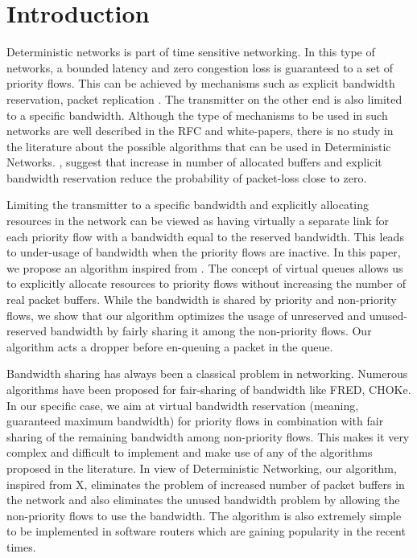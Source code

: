 \documentclass[conference]{IEEEtran}
\begin{document}
\section{Introduction}

Deterministic networks is part of time sensitive networking. In this type of networks, a bounded latency and zero congestion loss is guaranteed to a set of priority flows. This can be achieved by mechanisms such as explicit bandwidth reservation, packet replication \cite{detnetrfc}. The transmitter on the other end is also limited to a specific bandwidth. Although the type of mechanisms to be used in such networks are well described in the RFC and white-papers, there is no study in the literature about the possible algorithms that can be used in Deterministic Networks. \cite{detnetrfc}, \cite{detnetwhitepaper} suggest that increase in number of allocated buffers and explicit bandwidth reservation reduce the probability of packet-loss close to zero. 

Limiting the transmitter to a specific bandwidth and explicitly allocating resources in the network can be viewed as having virtually a separate link for each priority flow with a bandwidth equal to the reserved bandwidth. This leads to under-usage of bandwidth when the priority flows are inactive. In this paper, we propose an algorithm inspired from \cite{fairdroppaper}. The concept of virtual queues allows us to explicitly allocate resources to priority flows without increasing the number of real packet buffers. While the bandwidth is shared by priority and non-priority flows, we show that our algorithm optimizes the usage of unreserved and unused-reserved bandwidth by fairly sharing it among the non-priority flows. Our algorithm acts a dropper before en-queuing a packet in the queue.

Bandwidth sharing has always been a classical problem in networking. Numerous algorithms have been proposed for fair-sharing of bandwidth like FRED, CHOKe. In our specific case, we aim at virtual bandwidth reservation (meaning, guaranteed maximum bandwidth) for priority flows in combination with fair sharing of the remaining bandwidth among non-priority flows. This makes it very complex and difficult to implement and make use of any of the algorithms proposed in the literature.
In view of Deterministic Networking, our algorithm, inspired from X, eliminates the problem of increased number of packet buffers in the network and also eliminates the unused bandwidth problem by allowing the non-priority flows to use the bandwidth. The algorithm is also extremely simple to be implemented in software routers which are gaining popularity in the recent times.
\end{document}
